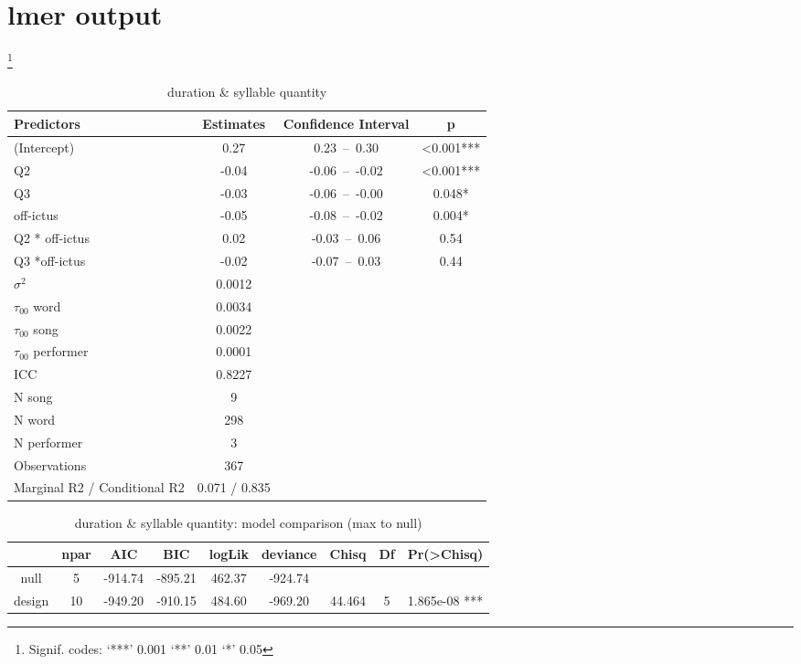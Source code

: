 \chapter{lmer output}
\footnote{Signif. codes:   ‘***’ 0.001 ‘**’ 0.01 ‘*’ 0.05 }
\begin{table}[htbp]
\caption{duration \& syllable quantity}
\begin{center}
\begin{tabular}{|l|c|c|c|}
\hline
{\bf Predictors}	&	{\bf Estimates}	&	{\bf Confidence Interval}	&	{\bf p}	\\
\hline
\hline
(Intercept)	&	0.27	&	0.23 – 0.30	&	<0.001***	\\
Q2	&	-0.04	&	-0.06 – -0.02	&	<0.001***	\\
Q3	&	-0.03	&	-0.06 – -0.00	&	0.048*	\\
off-ictus &	-0.05	&	-0.08 – -0.02	&	0.004*	\\
Q2 * off-ictus	&	0.02	&	-0.03 – 0.06	&	0.54	\\

Q3 *off-ictus	&	-0.02	&	-0.07 – 0.03	&	0.44	\\
\hline
\hline
$\sigma^2$ 	&	0.0012	&		&		\\
$\tau_{00}$ word	&	0.0034	&		&		\\
$\tau_{00}$ song	&	0.0022	&		&		\\
$\tau_{00}$ performer	&	0.0001	&		&		\\
ICC	&	0.8227	&		&		\\
\hline
\hline
N song	&	9	&		&		\\
N word	&	298	&		&		\\
N performer	&	3	&		&		\\
Observations	&	367	&		&		\\
Marginal R2 / Conditional R2	&	0.071 / 0.835	&		&		\\
\hline
\end{tabular}
\end{center}
\label{qdurrandoms}
\end{table}%





\begin{table}[htb]
\caption{duration \& syllable quantity: model comparison (max to null)}
\centering
\begin{tabular}{|ccccccccc|}
\hline
      & npar   &  AIC   &  BIC & logLik & deviance  & Chisq & Df & Pr(>Chisq)    \\
      \hline
      \hline
null  &  5 &-914.74 &-895.21 &462.37  &-924.74        &&& \\                 
design  &  10 &-949.20 &-910.15 &484.60 & -969.20 & 44.464  &5  &1.865e-08 *** \\
\hline

\end{tabular}
\label{qcomp}
\end{table}%


